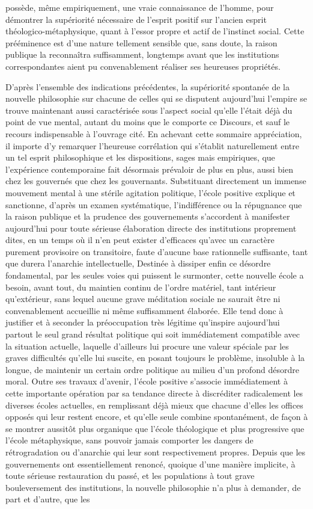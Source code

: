 \documentclass[french,twoside]{book} %
\begin{document}
possède, même empiriquement, une vraie connaissance de l’homme, pour démontrer la supériorité nécessaire de l’esprit positif sur l’ancien esprit théologico-métaphysique, quant à l’essor propre et actif de l’instinct social. Cette prééminence est d’une nature tellement sensible que, sans doute, la raison publique la reconnaîtra suffisamment, longtemps avant que les institutions correspondantes aient pu convenablement réaliser ses heureuses propriétés.\par
D’après l’ensemble des indications précédentes, la supériorité spontanée de la nouvelle philosophie sur chacune de celles qui se disputent aujourd’hui l’empire se trouve maintenant aussi caractérisée sous l’aspect social qu’elle l’était déjà du point de vue mental, autant du moins que le comporte ce Discours, et sauf le recours indispensable à l’ouvrage cité. En achevant cette sommaire appréciation, il importe d’y remarquer l’heureuse corrélation qui s’établit naturellement entre un tel esprit philosophique et les dispositions, sages mais empiriques, que l’expérience contemporaine fait désormais prévaloir de plus en plus, aussi bien chez les gouvernés que chez les gouvernants. Substituant directement un immense mouvement mental à une stérile agitation politique, l’école positive explique et sanctionne, d’après un examen systématique, l’indifférence ou la répugnance que la raison publique et la prudence des gouvernements s’accordent à manifester aujourd’hui pour toute sérieuse élaboration directe des institutions proprement dites, en un temps où il n’en peut exister d’efficaces qu’avec un caractère purement provisoire on transitoire, faute d’aucune base rationnelle suffisante, tant que durera l’anarchie intellectuelle, Destinée à dissiper enfin ce désordre fondamental, par les seules voies qui puissent le surmonter, cette nouvelle école a besoin, avant tout, du maintien continu de l’ordre matériel, tant intérieur qu’extérieur, sans lequel aucune grave méditation sociale ne saurait être ni convenablement accueillie ni même suffisamment élaborée. Elle tend donc à justifier et à seconder la préoccupation très légitime qu’inspire aujourd’hui partout le seul grand résultat politique qui soit immédiatement compatible avec la situation actuelle, laquelle d’ailleurs lui procure une valeur spéciale par les graves difficultés qu’elle lui suscite, en posant toujours le problème, insoluble à la longue, de maintenir un certain ordre politique au milieu d’un profond désordre moral. Outre ses travaux d’avenir, l’école positive s’associe immédiatement à cette importante opération par sa tendance directe à discréditer radicalement les diverses écoles actuelles, en remplissant déjà mieux que chacune d’elles les offices opposés qui leur restent encore, et qu’elle seule combine spontanément, de façon à se montrer aussitôt plus organique que l’école théologique et plus progressive que l’école métaphysique, sans pouvoir jamais comporter les dangers de rétrogradation ou d’anarchie qui leur sont respectivement propres. Depuis que les gouvernements ont essentiellement renoncé, quoique d’une manière implicite, à toute sérieuse restauration du passé, et les populations à tout grave bouleversement des institutions, la nouvelle philosophie n’a plus à demander, de part et d’autre, que les 
\end{document}
